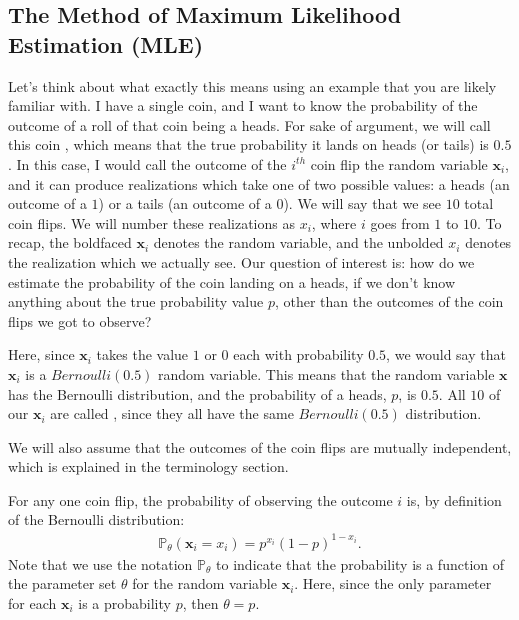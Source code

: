 \documentclass[letterpaper,10pt,english]{jupyterBook}
\begin{document}
\subsection{The Method of Maximum Likelihood Estimation (MLE)}
\label{\detokenize{representations/ch6/estimating-parameters_theory:the-method-of-maximum-likelihood-estimation-mle}}
\sphinxAtStartPar
Let’s think about what exactly this means using an example that you are likely familiar with. I have a single coin, and I want to know the probability of the outcome of a roll of that coin being a heads. For sake of argument, we will call this coin , which means that the true probability it lands on heads (or tails) is \(0.5\). In this case, I would call the outcome of the \(i^{th}\) coin flip the random variable \(\mathbf x_i\), and it can produce realizations which take one of two possible values: a heads (an outcome of a \(1\)) or a tails (an outcome of a \(0\)). We will say that we see \(10\) total coin flips. We will number these realizations as \(x_i\), where \(i\) goes from \(1\) to \(10\). To recap, the boldfaced \(\mathbf x_i\) denotes the random variable, and the unbolded \(x_i\) denotes the realization which we actually see. Our question of interest is: how do we estimate the probability of the coin landing on a heads, if we don’t know anything about the true probability value \(p\), other than the outcomes of the coin flips we got to observe?

\sphinxAtStartPar
Here, since \(\mathbf x_i\) takes the value \(1\) or \(0\) each with probability \(0.5\), we would say that \(\mathbf x_i\) is a \(Bernoulli(0.5)\) random variable. This means that the random variable \(\mathbf x\) has the Bernoulli distribution, and the probability of a heads, \(p\), is \(0.5\). All \(10\) of our \(\mathbf x_i\) are called , since they all have the same \(Bernoulli(0.5)\) distribution.

\sphinxAtStartPar
We will also assume that the outcomes of the coin flips are mutually independent, which is explained in the terminology section.

\sphinxAtStartPar
For any one coin flip, the probability of observing the outcome \(i\) is, by definition of the Bernoulli distribution:
\begin{align*}
    \mathbb P_\theta(\mathbf x_i = x_i) = p^{x_i} (1 - p)^{1 - x_i}.
\end{align*}
\sphinxAtStartPar
Note that we use the notation \(\mathbb P_\theta\) to indicate that the probability is a function of the parameter set \(\theta\) for the random variable \(\mathbf x_i\). Here, since the only parameter for each \(\mathbf x_i\) is a probability \(p\), then \(\theta = p\).
\end{document}

